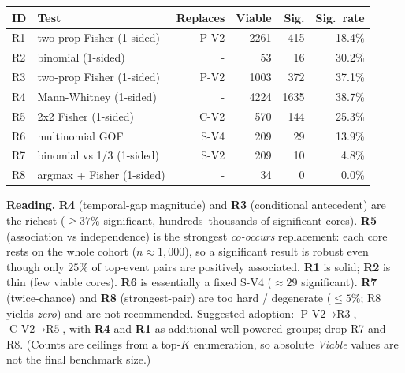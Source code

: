 \documentclass[11pt]{article}
\begin{document}
\begin{center}
\begin{tabular}{@{}llrrrr@{}}
\toprule
\textbf{ID} & \textbf{Test} & \textbf{Replaces} & \textbf{Viable} & \textbf{Sig.} & \textbf{Sig.\ rate} \\
\midrule
R1 & two-prop Fisher (1-sided) & P-V2 & 2261 & 415 & 18.4\% \\
R2 & binomial (1-sided) & - & 53 & 16 & 30.2\% \\
R3 & two-prop Fisher (1-sided) & P-V2 & 1003 & 372 & 37.1\% \\
R4 & Mann-Whitney (1-sided) & - & 4224 & 1635 & 38.7\% \\
R5 & 2x2 Fisher (1-sided) & C-V2 & 570 & 144 & 25.3\% \\
R6 & multinomial GOF & S-V4 & 209 & 29 & 13.9\% \\
R7 & binomial vs 1/3 (1-sided) & S-V2 & 209 & 10 & 4.8\% \\
R8 & argmax + Fisher (1-sided) & - & 34 & 0 & 0.0\% \\
\bottomrule
\end{tabular}
\end{center}

\noindent\textbf{Reading.} \textbf{R4} (temporal-gap magnitude) and \textbf{R3} (conditional antecedent) are the richest ($\geq37\%$ significant, hundreds--thousands of significant cores). \textbf{R5} (association vs independence) is the strongest \emph{co-occurs} replacement: each core rests on the whole cohort ($n\approx1{,}000$), so a significant result is robust even though only $25\%$ of top-event pairs are positively associated. \textbf{R1} is solid; \textbf{R2} is thin (few viable cores). \textbf{R6} is essentially a fixed S-V4 ($\approx29$ significant). \textbf{R7} (twice-chance) and \textbf{R8} (strongest-pair) are too hard / degenerate ($\leq5\%$; R8 yields \emph{zero}) and are not recommended. Suggested adoption: $\text{P-V2}\to\text{R3}$, $\text{C-V2}\to\text{R5}$, with \textbf{R4} and \textbf{R1} as additional well-powered groups; drop R7 and R8. (Counts are ceilings from a top-$K$ enumeration, so absolute \emph{Viable} values are not the final benchmark size.)
\end{document}
